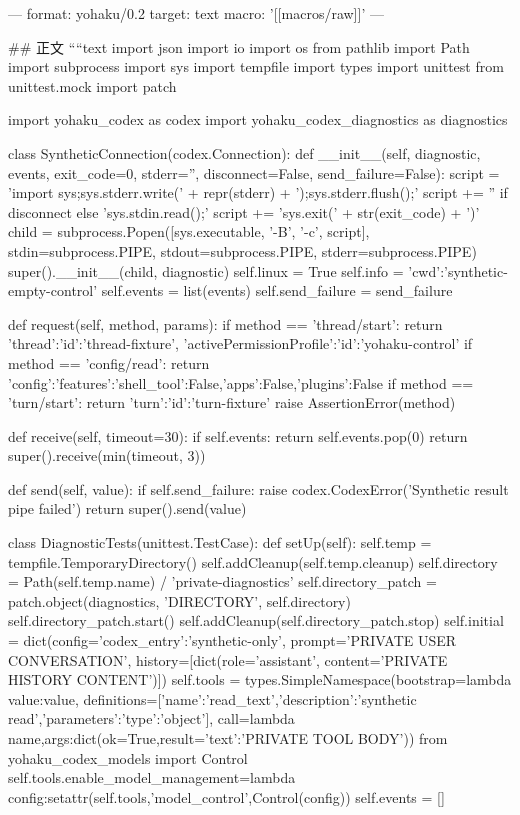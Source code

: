 ---
format: yohaku/0.2
target: text
macro: '[[macros/raw]]'
---

## 正文
````text
import json
import io
import os
from pathlib import Path
import subprocess
import sys
import tempfile
import types
import unittest
from unittest.mock import patch

import yohaku_codex as codex
import yohaku_codex_diagnostics as diagnostics


class SyntheticConnection(codex.Connection):
    def __init__(self, diagnostic, events, exit_code=0, stderr='', disconnect=False, send_failure=False):
        script = 'import sys;sys.stderr.write(' + repr(stderr) + ');sys.stderr.flush();'
        script += '' if disconnect else 'sys.stdin.read();'
        script += 'sys.exit(' + str(exit_code) + ')'
        child = subprocess.Popen([sys.executable, '-B', '-c', script], stdin=subprocess.PIPE,
                                 stdout=subprocess.PIPE, stderr=subprocess.PIPE)
        super().__init__(child, diagnostic)
        self.linux = True
        self.info = {'cwd':'synthetic-empty-control'}
        self.events = list(events)
        self.send_failure = send_failure

    def request(self, method, params):
        if method == 'thread/start':
            return {'thread':{'id':'thread-fixture'}, 'activePermissionProfile':{'id':'yohaku-control'}}
        if method == 'config/read':
            return {'config':{'features':{'shell_tool':False,'apps':False,'plugins':False}}}
        if method == 'turn/start':
            return {'turn':{'id':'turn-fixture'}}
        raise AssertionError(method)

    def receive(self, timeout=30):
        if self.events:
            return self.events.pop(0)
        return super().receive(min(timeout, 3))

    def send(self, value):
        if self.send_failure:
            raise codex.CodexError('Synthetic result pipe failed')
        return super().send(value)


class DiagnosticTests(unittest.TestCase):
    def setUp(self):
        self.temp = tempfile.TemporaryDirectory()
        self.addCleanup(self.temp.cleanup)
        self.directory = Path(self.temp.name) / 'private-diagnostics'
        self.directory_patch = patch.object(diagnostics, 'DIRECTORY', self.directory)
        self.directory_patch.start()
        self.addCleanup(self.directory_patch.stop)
        self.initial = dict(config={'codex_entry':'synthetic-only'}, prompt='PRIVATE USER CONVERSATION',
                            history=[dict(role='assistant', content='PRIVATE HISTORY CONTENT')])
        self.tools = types.SimpleNamespace(bootstrap=lambda value:value,
            definitions=[{'name':'read_text','description':'synthetic read','parameters':{'type':'object'}}],
            call=lambda name,args:dict(ok=True,result={'text':'PRIVATE TOOL BODY'}))
        from yohaku_codex_models import Control
        self.tools.enable_model_management=lambda config:setattr(self.tools,'model_control',Control(config))
        self.events = []

